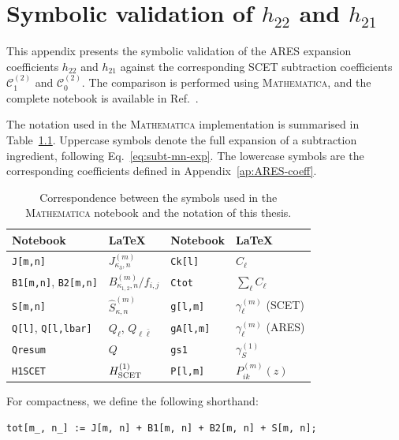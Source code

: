 \chapter{Symbolic validation of \texorpdfstring{$h_{22}$}{h22} and
         \texorpdfstring{$h_{21}$}{h21}}
\label{ap:symb-val}

This appendix presents the symbolic validation of the \textsc{ARES}
expansion coefficients $h_{22}$ and $h_{21}$ against the corresponding
SCET subtraction coefficients $\mathcal{C}^{(2)}_1$ and
$\mathcal{C}^{(2)}_0$. The comparison is performed using
\textsc{Mathematica}, and the complete notebook is available in
Ref.~\cite{peake2026validation}.

The notation used in the \textsc{Mathematica} implementation is summarised
in Table~\ref{tab:mma-symbols}. Uppercase symbols denote the full
expansion of a subtraction ingredient, following
Eq.~\eqref{eq:subt-mn-exp}. The lowercase symbols are the corresponding
coefficients defined in Appendix~\ref{ap:ARES-coeff}.

\begin{table}[h]
\begin{center}
\begin{tabular}{ll|ll}
\hline\hline
Notebook & LaTeX & Notebook & LaTeX \\
\hline\hline
\texttt{J[m,n]} & $J^{(m)}_{\kappa_3,n}$ &
\texttt{Ck[l]} & $C_\ell$ \\
\texttt{B1[m,n]}, \texttt{B2[m,n]} &
$B^{(m)}_{\kappa_{1,2},n}/f_{i,j}$ &
\texttt{Ctot} & $\sum_\ell C_\ell$ \\
\texttt{S[m,n]} & $\widehat{S}^{(m)}_{\kappa,n}$ &
\texttt{g[l,m]} & $\gamma^{(m)}_\ell$ (SCET) \\
\texttt{Q[l]}, \texttt{Q[l,lbar]} &
$Q_\ell$, $Q_{\ell\bar\ell}$ &
\texttt{gA[l,m]} & $\gamma^{(m)}_\ell$ (ARES) \\
\texttt{Qresum} & $Q$ &
\texttt{gs1} & $\gamma^{(1)}_S$ \\
\texttt{H1SCET} & $H^{(1)}_{\rm SCET}$ &
\texttt{P[l,m]} & $P^{(m)}_{ik}(z)$ \\
\hline\hline
\end{tabular}
\end{center}
\caption{Correspondence between the symbols used in the
\textsc{Mathematica} notebook and the notation of this thesis.}
\label{tab:mma-symbols}
\end{table}

For compactness, we define the following shorthand:
\begin{lstlisting}[style=mma, caption={Definition of the shorthand used
for the subtraction ingredients.}]
tot[m_, n_] := J[m, n] + B1[m, n] + B2[m, n] + S[m, n];
\end{lstlisting}

